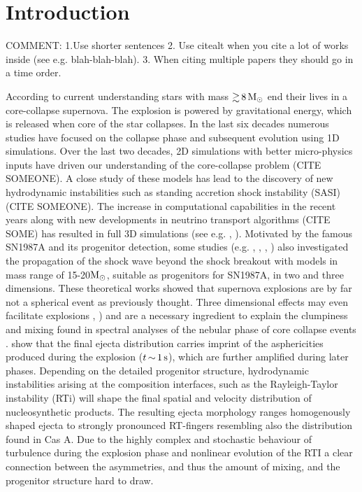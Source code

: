 \documentclass[fleqn,usenatbib]{mnras}
\newcommand{\solm}{\xspace\ensuremath{\rm{M_{\odot}}}}
\newcommand{\NY}[2]{{\color{blue}\sout{#1}#2}}
\begin{document}
\section{Introduction}
\NY{}{COMMENT: 1.Use shorter sentences 2. Use citealt when you cite a lot of works inside (see e.g. blah-blah-blah). 3. When citing multiple papers they should go in a time order.}

According to current understanding stars with mass $\mathord{\gtrsim}\,8\, \solm$ end their lives in a core-collapse supernova. The explosion is powered by gravitational energy, which is released when core of the star collapses. In the last six decades numerous studies have focused on the collapse phase and subsequent evolution using 1D simulations. Over the last two decades, 2D simulations with better micro-physics inputs have driven our understanding of the core-collapse problem (CITE SOMEONE). A close study of these models has lead to the discovery of new hydrodynamic instabilities such as standing accretion shock instability (SASI) (CITE SOMEONE). The increase in computational capabilities in the recent years along with new developments in neutrino transport algorithms (CITE SOME) has resulted in full 3D simulations (see e.g. \citealt{Melson2015a}, \citealt{Vartanyan2018}). Motivated by the famous SN1987A and its progenitor detection, some studies (e.g. \citealt{Mueller1991}, \citealt{Kifonidis2003}, \citealt{Hammer2010}, \citealt{Wongwathanarat2015}) also investigated the propagation of the shock wave beyond the shock breakout with models in mass range of 15-20\solm, suitable as progenitors for SN1987A, in two and three dimensions. 
These theoretical works showed that supernova explosions are by far not a spherical event as previously thought. Three dimensional effects may even facilitate explosions \cite{Muellera}, \cite{Melson2015}) and are a necessary ingredient to explain the clumpiness and mixing found in spectral analyses of the nebular phase of core collapse events \citep{Jerkstrand2011}. 
\citet{Wongwathanarat_2013} show that the final ejecta distribution carries imprint of the 
asphericities produced during the explosion ($t\,\mathord{\sim}\, 1\, \rm s$), which are further amplified during later phases. Depending on the detailed progenitor structure, hydrodynamic instabilities arising at the composition interfaces, such as the Rayleigh-Taylor instability (RTi) will shape the final spatial and velocity distribution of nucleosynthetic products. The resulting ejecta morphology ranges homogenously shaped ejecta to strongly pronounced RT-fingers resembling also the  distribution found in Cas A. Due to the highly complex and stochastic behaviour of turbulence during the explosion phase and nonlinear evolution of the RTI a clear connection between the asymmetries, and thus the amount of mixing, and the progenitor structure hard to draw.
\end{document}

